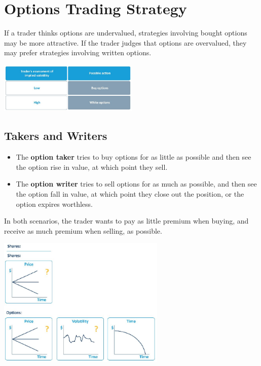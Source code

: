 \documentclass[12pt, a4paper]{article}
\begin{document}
\pagebreak
\section*{Options Trading Strategy}

If a trader thinks options are undervalued, strategies involving bought options may be more attractive.
If the trader judges that options are overvalued, they may prefer strategies involving written options.

\begin{center}
    \includegraphics[width=0.5\textwidth]{options_trading_strategy.JPG}
\end{center}

\subsection*{Takers and Writers}
\begin{itemize}
    \item The \textbf{option taker} tries to buy options for as little as possible and then see the option rise in value, at which point they
          sell.
    \item The \textbf{option writer} tries to sell options for as much as possible, and then see the option fall in value, at which point they
          close out the position, or the option expires worthless.
\end{itemize}

In both scenarios, the trader wants to pay as little premium when buying, and receive as much premium when selling,
as possible.

\begin{center}
    \includegraphics[width=0.6\textwidth]{options_strategy_graph}
\end{center}
\end{document}
